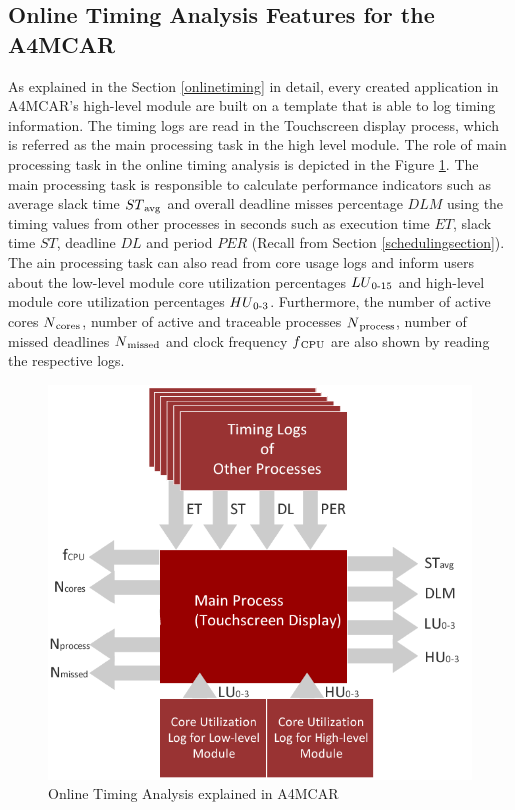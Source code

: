 \subsection{Online Timing Analysis Features for the A4MCAR}
As explained in the Section \ref{onlinetiming} in detail, every created application in A4MCAR's high-level module are built on a template that is able to log timing information. The timing logs are read in the Touchscreen display process, which is referred as the main processing task in the high level module. The role of main processing task in the online timing analysis is depicted in the Figure \ref{fig:a4mcartiming}. The main processing task is responsible to calculate performance indicators such as average slack time ${ST\textsubscript{avg}}$ and overall deadline misses percentage ${DLM}$ using the timing values from other processes in seconds such as execution time ${ET}$, slack time ${ST}$, deadline ${DL}$ and period ${PER}$ (Recall from Section \ref{schedulingsection}). The ain processing task can also read from core usage logs and inform users about the low-level module core utilization percentages ${LU\textsubscript{0-15}}$ and high-level module core utilization percentages ${HU\textsubscript{0-3}}$. Furthermore, the number of active cores ${N\textsubscript{cores}}$, number of active and traceable processes ${N\textsubscript{process}}$, number of missed deadlines ${N\textsubscript{missed}}$ and clock frequency ${f\textsubscript{CPU}}$ are also shown by reading the respective logs. 
\begin{figure}[!ht]
	\centering
	\captionsetup{justification=centering}
	\includegraphics[scale=0.55]{content/images/a4mcartiming.png}
	\caption{Online Timing Analysis explained in A4MCAR}
	\label{fig:a4mcartiming}
\end{figure}

